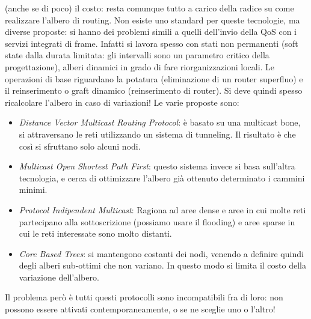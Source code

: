 (anche se di poco) il costo: resta comunque tutto a carico della radice su come realizzare l'albero di routing.
Non esiste uno standard per queste tecnologie, ma diverse proposte: si hanno dei problemi simili a quelli dell'invio
della QoS con i servizi integrati di frame.
Infatti si lavora spesso con stati non permanenti (soft state dalla durata limitata: gli intervalli sono un parametro
critico della progettazione), alberi dinamici in grado di fare riorganizzazioni locali. Le operazioni di base riguardano
la potatura (eliminazione di un router superfluo) e il reinserimento o graft dinamico (reinserimento di router). Si deve
quindi spesso ricalcolare l'albero in caso di variazioni! Le varie proposte sono:
\begin{itemize}
 \item \textit{Distance Vector Multicast Routing Protocol}: è basato su una multicast bone, si attraversano le reti
 utilizzando un sistema di tunneling. Il risultato è che così si sfruttano solo alcuni nodi.
 \item \textit{Multicast Open Shortest Path First}: questo sistema invece si basa sull'altra tecnologia, e cerca di
 ottimizzare l'albero già ottenuto determinato i cammini minimi.
 \item \textit{Protocol Indipendent Multicast}: Ragiona ad aree dense e aree in cui molte reti partecipano alla sottoscrizione (possiamo usare il flooding) e aree sparse in cui le reti interessate sono molto distanti.
 \item \textit{Core Based Trees}: si mantengono costanti dei nodi, venendo a definire quindi degli alberi sub-ottimi
 che non variano. In questo modo si limita il costo della variazione dell'albero.
\end{itemize}
Il problema però è tutti questi protocolli sono incompatibili fra di loro: non possono essere attivati
contemporaneamente, o se ne sceglie uno o l'altro!
